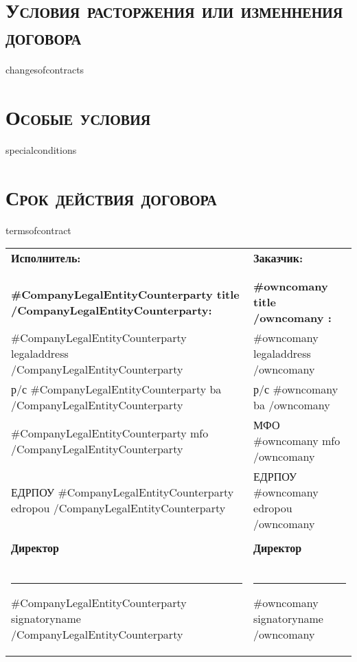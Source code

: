 {{{{{{\section{\large \textbf{\textsc{Условия расторжения или изменнения договора}}}
{{changesofcontracts}}

\section{\large \textbf{\textsc{Особые условия}}}
{{specialconditions}}

\section{\large \textbf{\textsc{Срок действия договора}}}
{{termsofcontract}}


\begin{tabularx}{\textwidth}{ X@{\hskip 0.5in} X }

\textbf{Исполнитель:}  & \textbf{Заказчик:} \\
 & \\
 & \\
 \textbf{ {{#CompanyLegalEntityCounterparty}} {{title}}  {{/CompanyLegalEntityCounterparty}}:} & \textbf{ {{#owncomany}} {{title}} {{/owncomany}} :} \\
 {{#CompanyLegalEntityCounterparty}} {{legaladdress}}  {{/CompanyLegalEntityCounterparty}}  &  {{#owncomany}}  {{legaladdress}}  {{/owncomany}}  \\
 р/с   {{#CompanyLegalEntityCounterparty}} {{ba}}  {{/CompanyLegalEntityCounterparty}}                                                &  р/с  {{#owncomany}}  {{ba}}  {{/owncomany}}  \\
 {{#CompanyLegalEntityCounterparty}} {{mfo}}  {{/CompanyLegalEntityCounterparty}} &  МФО {{#owncomany}}  {{mfo}}   {{/owncomany}}   \\
 ЕДРПОУ {{#CompanyLegalEntityCounterparty}} {{edropou}}  {{/CompanyLegalEntityCounterparty}} & ЕДРПОУ {{#owncomany}} {{edropou}}  {{/owncomany}}  \\
 & \\
 \textbf{Директор}  & \textbf{Директор} \\
 & \\
 & \\
 & \\
 \noindent\rule{4cm}{0.5pt} {{#CompanyLegalEntityCounterparty}} {{signatoryname}}  {{/CompanyLegalEntityCounterparty}}   & \noindent\rule{5cm}{0.5pt} {{#owncomany}} {{signatoryname}}  {{/owncomany}}  \\
 \end{tabularx}


}}}}}}
